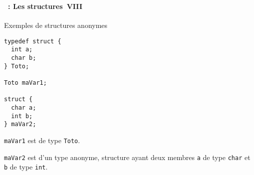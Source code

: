 \begin{frame}[containsverbatim]
  \frametitle{\secname}
  \framesubtitle{\subsecname~: Les structures~VIII} 

  {\small\begin{exampleblock}{Exemples de structures anonymes}
    \begin{verbatim}
typedef struct {
  int a;
  char b;
} Toto;

Toto maVar1;

struct { 
  char a;
  int b;
} maVar2;
    \end{verbatim}
  \end{exampleblock}}
  \par
  \verb|maVar1| est de type \verb|Toto|. 
  \par 
  \verb|maVar2| est d'un type anonyme, structure ayant deux membres \verb|a| de type \verb|char| et \verb|b|
  de type \verb|int|.
\end{frame}
